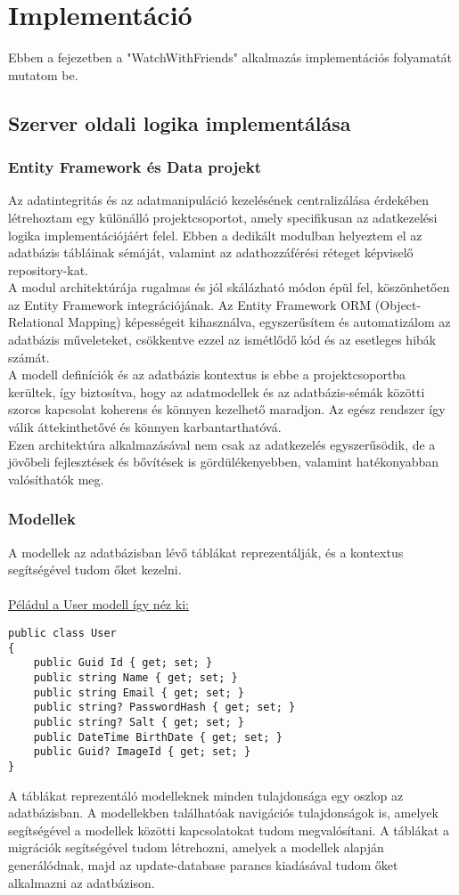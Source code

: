 \chapter{Implement\'aci\'o}\label{chapter:implementation}
Ebben a fejezetben a "WatchWithFriends" alkalmazás implementációs folyamatát mutatom be.
\section*{Szerver oldali logika implementálása}
\subsection*{Entity Framework és Data projekt}
Az adatintegritás és az adatmanipuláció kezelésének centralizálása érdekében létrehoztam egy különálló projektcsoportot, amely specifikusan az adatkezelési logika implementációjáért felel. Ebben a dedikált modulban helyeztem el az adatbázis tábláinak sémáját, valamint az adathozzáférési réteget képviselő repository-kat.
\\
A modul architektúrája rugalmas és jól skálázható módon épül fel, köszönhetően az Entity Framework integrációjának. Az Entity Framework ORM (Object-Relational Mapping) képességeit kihasználva, egyszerűsítem és automatizálom az adatbázis műveleteket, csökkentve ezzel az ismétlődő kód és az esetleges hibák számát.
\\
A modell definíciók és az adatbázis kontextus is ebbe a projektcsoportba kerültek, így biztosítva, hogy az adatmodellek és az adatbázis-sémák közötti szoros kapcsolat koherens és könnyen kezelhető maradjon. Az egész rendszer így válik áttekinthetővé és könnyen karbantarthatóvá.
\\
Ezen architektúra alkalmazásával nem csak az adatkezelés egyszerűsödik, de a jövőbeli fejlesztések és bővítések is gördülékenyebben, valamint hatékonyabban valósíthatók meg.
\subsection*{Modellek}
A modellek az adatbázisban lévő táblákat reprezentálják, és a kontextus segítségével tudom őket kezelni.
\\
\\
\underline{Péládul a User modell így néz ki:}
\begin{lstlisting}[language=CSharp,style=CSharpBase,caption={User modell}]
public class User
{
    public Guid Id { get; set; }
    public string Name { get; set; }
    public string Email { get; set; }
    public string? PasswordHash { get; set; }
    public string? Salt { get; set; }
    public DateTime BirthDate { get; set; }
    public Guid? ImageId { get; set; }
}
\end{lstlisting}
\vspace{1em}
A táblákat reprezentáló modelleknek minden tulajdonsága egy oszlop az adatbázisban.
A modellekben találhatóak navigációs tulajdonságok is, amelyek segítségével a modellek közötti kapcsolatokat tudom megvalósítani.
A táblákat a migrációk segítségével tudom létrehozni, amelyek a modellek alapján generálódnak, majd az update-database parancs kiadásával tudom őket alkalmazni az adatbázison.

